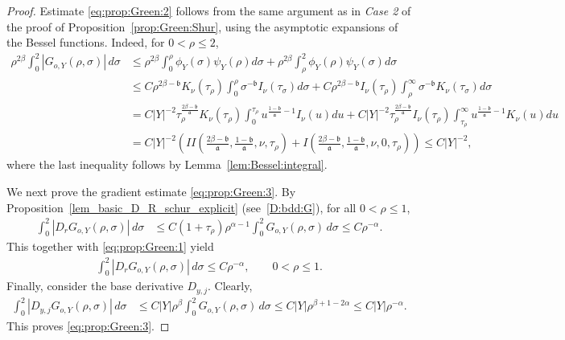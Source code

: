 \documentclass[12pt]{amsart}
\begin{document}
\begin{proof}
Estimate \eqref{eq:prop:Green:2} follows from the same argument as in \textit{Case 2} of the proof of Proposition~\ref{prop:Green:Shur}, using the asymptotic expansions of the Bessel functions. Indeed, for $0<\rho\le 2$,
\begin{align*}
     \rho^{2\beta}\int_0^2 |G_{o,Y}(\rho,\sigma)| \, d\sigma &\le \rho^{2\beta} \int_0^\rho \phi_Y(\sigma) \psi_Y(\rho) d\sigma + \rho^{2\beta} \int_\rho^2 \phi_Y(\rho) \psi_Y(\sigma) d\sigma\\
     &\le C \rho^{2\beta -\mathfrak b} K_\nu(\tau_\rho) \int_0^\rho \sigma^{-\mathfrak b} I_\nu(\tau_\sigma) d\sigma + C \rho^{2\beta -\mathfrak b} I_\nu(\tau_\rho) \int_\rho^\infty \sigma^{-\mathfrak b} K_\nu(\tau_\sigma) d\sigma\\
     &=C|Y|^{-2} \tau_\rho^{\frac{2\beta-\mathfrak b}{\mathfrak a}} K_\nu(\tau_\rho) \int_0^{\tau_\rho} u^{\frac{1-\mathfrak b}{\mathfrak a}-1} I_\nu(u) du + C|Y|^{-2} \tau_\rho^{\frac{2\beta-\mathfrak b}{\mathfrak a}} I_\nu(\tau_\rho) \int_{\tau_\rho}^\infty u^{\frac{1-\mathfrak b}{\mathfrak a}-1} K_\nu(u) du\\
     &= C|Y|^{-2} \left( II\left(\frac{2\beta-\mathfrak b}{\mathfrak a}, \frac{1-\mathfrak b}{\mathfrak a},\nu, \tau_\rho \right) + I\left(\frac{2\beta-\mathfrak b}{\mathfrak a}, \frac{1-\mathfrak b}{\mathfrak a},\nu,0, \tau_\rho \right) \right) \le C |Y|^{-2},
\end{align*}
where the last inequality follows by Lemma~\ref{lem:Bessel:integral}.

We next prove the gradient estimate \eqref{eq:prop:Green:3}. By Proposition~\ref{lem_basic_D_R_schur_explicit} (see~\eqref{D:bdd:G}), for all $0<\rho\le 1$,
\begin{align*}
    \int_0^2 |D_r G_{o,Y}(\rho,\sigma)| \, d\sigma
    &\le C(1+\tau_\rho) \rho^{\alpha-1} \int_0^2 G_{o,Y}(\rho,\sigma) \, d\sigma \le C \rho^{-\alpha}.
\end{align*}
This together with \eqref{eq:prop:Green:1} yield
\begin{align*}
    \int_0^2 |D_r G_{o,Y}(\rho,\sigma)| \, d\sigma \le C \rho^{-\alpha},\qquad 0<\rho\le 1.
\end{align*}
Finally, consider the base derivative $D_{y,j}$. Clearly,
\begin{align*}
    \int_0^2 |D_{y,j}G_{o,Y}(\rho,\sigma)| \, d\sigma
    &\le C|Y| \rho^{\beta} \int_0^2 G_{o,Y}(\rho,\sigma) \, d\sigma \le C|Y| \rho^{\beta+1-2\alpha}\le C |Y| \rho^{-\alpha}.
\end{align*}
This proves \eqref{eq:prop:Green:3}.
\end{proof}
\end{document}
